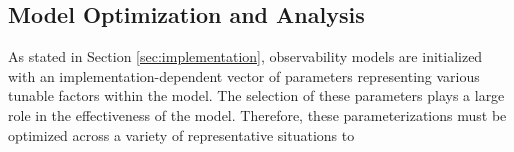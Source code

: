 \subsection{Model Optimization and Analysis}

As stated in Section \ref{sec:implementation}, observability models are initialized with an implementation-dependent vector of parameters representing various tunable factors within the model. The selection of these parameters plays a large role in the effectiveness of the model. Therefore, these parameterizations must be optimized across a variety of representative situations to  

\subsubsection{}